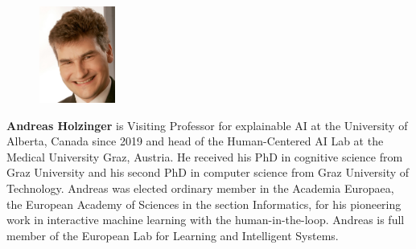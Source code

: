 
 \begin{figure} 
    \includegraphics[width=1in,height=1.25in,clip,keepaspectratio]{bio-images/holzinger.jpg}
  \end{figure}\par
  \textbf{Andreas Holzinger} is Visiting Professor for explainable AI at the University of Alberta, Canada since 2019 and head of the Human-Centered AI Lab at the Medical University Graz, Austria. He received his PhD in cognitive science from Graz University and his second PhD in computer science from Graz University of Technology. Andreas was elected ordinary member in the Academia Europaea, the European Academy of Sciences in the section Informatics, for his pioneering work in interactive machine learning with the human-in-the-loop. Andreas is full member of the European Lab for Learning and Intelligent Systems.\par
